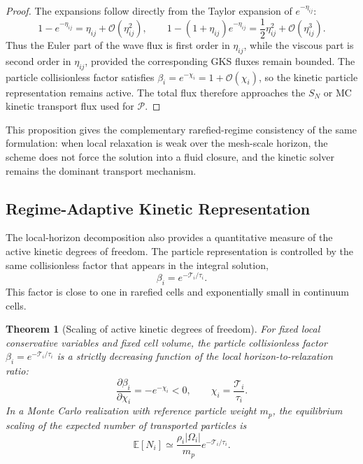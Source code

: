 \documentclass[preprint,12pt]{elsarticle}
\newtheorem{theorem}{Theorem}
\begin{document}
\begin{proof}
The expansions follow directly from the Taylor expansion of $e^{-\eta_{ij}}$:
\begin{equation}
    1-e^{-\eta_{ij}}
    =
    \eta_{ij}+\mathcal O(\eta_{ij}^2),
    \qquad
    1-(1+\eta_{ij})e^{-\eta_{ij}}
    =
    \frac{1}{2}\eta_{ij}^2+\mathcal O(\eta_{ij}^3).
\end{equation}
Thus the Euler part of the wave flux is first order in $\eta_{ij}$, while the viscous part is second order in $\eta_{ij}$, provided the corresponding GKS fluxes remain bounded. The particle collisionless factor satisfies $\beta_i=e^{-\chi_i}=1+\mathcal O(\chi_i)$, so the kinetic particle representation remains active. The total flux therefore approaches the $S_N$ or MC kinetic transport flux used for $\mathcal{P}$.
\end{proof}

This proposition gives the complementary rarefied-regime consistency of the same formulation: when local relaxation is weak over the mesh-scale horizon, the scheme does not force the solution into a fluid closure, and the kinetic solver remains the dominant transport mechanism.

\subsection{Regime-Adaptive Kinetic Representation}

The local-horizon decomposition also provides a quantitative measure of the active kinetic degrees of freedom. The particle representation is controlled by the same collisionless factor that appears in the integral solution,
\begin{equation}\label{eq:beta_particle_fraction}
    \beta_i=e^{-\mathcal{T}_i/\tau_i}.
\end{equation}
This factor is close to one in rarefied cells and exponentially small in continuum cells.

\begin{theorem}[Scaling of active kinetic degrees of freedom]\label{thm:ra}
For fixed local conservative variables and fixed cell volume, the particle collisionless factor $\beta_i=e^{-\mathcal{T}_i/\tau_i}$ is a strictly decreasing function of the local horizon-to-relaxation ratio:
\begin{equation}\label{eq:beta_monotonicity}
    \frac{\partial \beta_i}{\partial \chi_i}
    =
    -e^{-\chi_i}<0,
    \qquad
    \chi_i=\frac{\mathcal{T}_i}{\tau_i}.
\end{equation}
In a Monte Carlo realization with reference particle weight $m_p$, the equilibrium scaling of the expected number of transported particles is
\begin{equation}\label{eq:expected_particle_number}
    \mathbb E[N_i]
    \simeq
    \frac{\rho_i|\Omega_i|}{m_p}
    e^{-\mathcal{T}_i/\tau_i}.
\end{equation}
\end{theorem}
\end{document}
